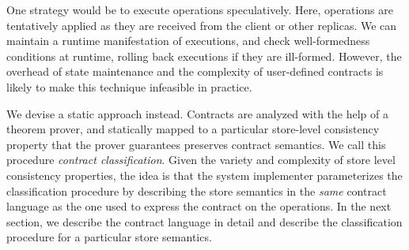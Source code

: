 One strategy would be to execute operations speculatively.  Here, operations
are tentatively applied as they are received from the client or other replicas.
We can maintain a runtime manifestation of executions, and check
well-formedness conditions at runtime, rolling back executions if they are
ill-formed. However, the overhead of state maintenance and the complexity of
user-defined contracts is likely to make this technique infeasible in practice.

We devise a static approach instead. Contracts are analyzed with the help of a
theorem prover, and statically mapped to a particular store-level consistency
property that the prover guarantees preserves contract semantics. We call this
procedure \emph{contract classification}. Given the variety and complexity of
store level consistency properties, the idea is that the system implementer
parameterizes the classification procedure by describing the store semantics in
the \emph{same} contract language as the one used to express the contract on
the operations. In the next section, we describe the contract language in
detail and describe the classification procedure for a particular store
semantics.
